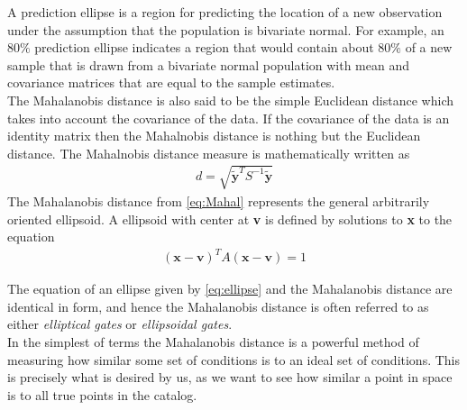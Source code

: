 \documentclass[]{aiaa-tc}%
\begin{document}
A prediction ellipse is a region for predicting the location of a new observation under the assumption that the population is bivariate normal. For example, an $80\%$ prediction ellipse indicates a region that would contain about $80\%$ of a new sample that is drawn from a bivariate normal population with mean and covariance matrices that are equal to the sample estimates.\\

The Mahalanobis distance is also said to be the simple Euclidean distance which takes into account the covariance of the data. If the covariance of the data is an identity matrix then the Mahalnobis distance is nothing but the Euclidean distance. The Mahalnobis distance measure is mathematically written as
\begin{align}
\label{eq:Mahal}
d = \sqrt{\tilde{\textbf{y}}^TS^{-1}\tilde{\textbf{y}}}
\end{align}
The Mahalanobis distance from \cref{eq:Mahal} represents the general arbitrarily oriented ellipsoid. A ellipsoid with center at \textbf{v} is defined by solutions to \textbf{x} to the equation
\begin{align}
\label{eq:ellipse}
(\textbf{x}-\textbf{v})^{T}A(\textbf{x}-\textbf{v})  = 1
\end{align}

The equation of an ellipse given by \cref{eq:ellipse} and the Mahalanobis distance are identical in form, and hence the Mahalanobis distance is often referred to as either \textit{elliptical gates} or \textit{ellipsoidal gates}.\\

In the simplest of terms the Mahalanobis distance is a powerful method of measuring how similar some set of conditions is to an ideal set of conditions. This is precisely what is desired by us, as we want to see how similar a point in space is to all true points in the catalog.\\
\end{document}
